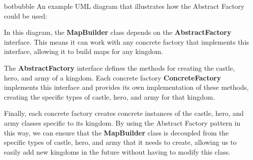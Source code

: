 \begin{chatout}{botbubble}{}
An example UML diagram that illustrates how the Abstract Factory could be used:
\begin{center} 
\end{center} 
In this diagram, the \textbf{MapBuilder} class depends on the \textbf{AbstractFactory} interface. This means it can work with any concrete factory that implements this interface, allowing it to build maps for any kingdom. 

The \textbf{AbstractFactory} interface defines the methods for creating the castle, hero, and army of a kingdom. Each concrete factory \textbf{ConcreteFactory} implements this interface and provides its own implementation of these methods, creating the specific types of castle, hero, and army for that kingdom.

Finally, each concrete factory creates concrete instances of the castle, hero, and army classes specific to its kingdom. By using the Abstract Factory pattern in this way, we can ensure that the \textbf{MapBuilder} class is decoupled from the specific types of castle, hero, and army that it needs to create, allowing us to easily add new kingdoms in the future without having to modify this class.
\end{chatout}

